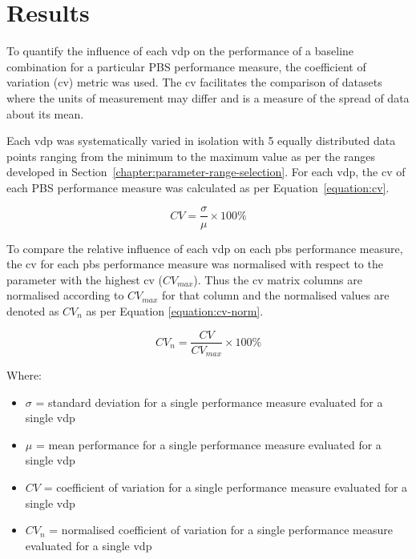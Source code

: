 \chapter{Results}\label{chapter:results}

To quantify the influence of each \gls{vdp} on the performance of a baseline combination for a particular PBS performance measure, the coefficient of variation (\gls{cv}) metric was used. The \gls{cv} facilitates the comparison of datasets where the units of measurement may differ \cite{Soong2004} and is a measure of the spread of data about its mean.

Each \gls{vdp} was systematically varied in isolation with 5 equally distributed data points ranging from the minimum to the maximum value as per the ranges developed in Section~\ref{chapter:parameter-range-selection}. For each \gls{vdp}, the \gls{cv} of each PBS performance measure was calculated as per Equation~\ref{equation:cv}.

\begin{equation}
    \label{equation:cv}
    CV = \frac{\sigma}{\mu} \times 100\%
\end{equation}

To compare the relative influence of each \gls{vdp} on each \gls{pbs} performance measure, the \gls{cv} for each \gls{pbs} performance measure was normalised with respect to the parameter with the highest \gls{cv} ($CV_{max}$). Thus the \gls{cv} matrix columns are normalised according to $CV_{max}$ for that column and the normalised values are denoted as $CV_n$ as per Equation \ref{equation:cv-norm}.

\begin{equation}
    \label{equation:cv-norm}
    CV_{n} = \frac{CV}{CV_{max}} \times 100\%
\end{equation}

Where:
\begin{itemize}[label={}]
\item $\sigma$ = standard deviation for a single performance measure evaluated for a single \gls{vdp}
\item $\mu$ = mean performance for a single performance measure evaluated for a single \gls{vdp}
\item $CV$ = coefficient of variation for a single performance measure evaluated for a single \gls{vdp}
\item $CV_n$ = normalised coefficient of variation for a single performance measure evaluated for a single \gls{vdp}
\end{itemize}

